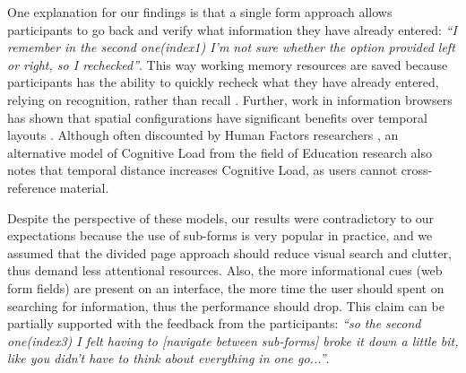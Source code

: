 \documentclass[../main/Replicate.tex]{subfiles}
\begin{document}
	One explanation for our findings is that a single form approach allows participants to go back and verify what information they have already entered: \textit{``I remember in the second one(index1) I'm not sure whether the option provided left or right, so I rechecked''}. 
	This way working memory resources are saved because participants has the ability to quickly recheck what they have already entered, relying on recognition, rather than recall \cite{nielsen1990heuristic}. Further, work in information browsers has shown that spatial configurations have significant benefits over temporal layouts \cite{eps258800}. Although often discounted by Human Factors researchers \cite{wilson2015evaluation}, an alternative model of Cognitive Load from the field of Education research \cite{sweller1988cognitive} also notes that temporal distance increases Cognitive Load, as users cannot cross-reference material.
	
	Despite the perspective of these models, our results were contradictory to our expectations because the use of sub-forms is very popular in practice, and we assumed that the divided page approach should reduce visual search and clutter, thus demand less attentional resources. 
	Also, the more informational cues (web form fields) are present on an interface, the more time the user should spent on searching for information, thus the performance should drop. 
	This claim can be partially supported with the feedback from the participants: \textit{``so the second one(index3) I felt having to [navigate between sub-forms] broke it down a little bit, like you didn't have to think about everything in one go...''}. 
\end{document}
